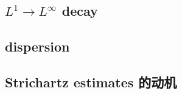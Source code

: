 

\subsection{\texorpdfstring{\(L^1\to L^\infty\)}{L1∞} decay}
\label{b2:subsec:110401}

\subsection{dispersion}
\label{b2:subsec:110402}

\subsection{Strichartz estimates 的动机}
\label{b2:subsec:110403}


